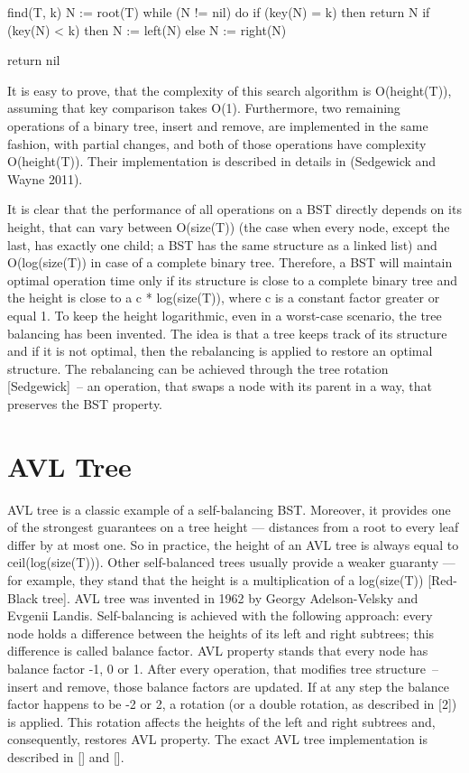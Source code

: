 find(T, k)
N := root(T)
while (N != nil) do
  if (key(N) = k) then
    return N
  if (key(N) < k) then
    N := left(N)
  else
    N := right(N)

return nil

It is easy to prove, that the complexity of this search algorithm is O(height(T)), assuming that key comparison takes O(1). Furthermore, two remaining operations of a binary tree, insert and remove, are implemented in the same fashion, with partial changes, and both of those operations have complexity O(height(T)). Their implementation is described in details in (Sedgewick and Wayne 2011).

It is clear that the performance of all operations on a BST directly depends on its height, that can vary between O(size(T)) (the case when every node, except the last, has exactly one child; a BST has the same structure as a linked list) and O(log(size(T)) in case of a complete binary tree. Therefore, a BST will maintain optimal operation time only if its structure is close to a complete binary tree and the height is close to a c * log(size(T)), where c is a constant factor greater or equal 1. To keep the height logarithmic, even in a worst-case scenario, the tree balancing has been invented. The idea is that a tree keeps track of its structure and if it is not optimal, then the rebalancing is applied to restore an optimal structure. The rebalancing can be achieved through the tree rotation [Sedgewick]~-- an operation, that swaps a node with its parent in a way, that preserves the BST property.


\section{AVL Tree}

AVL tree is a classic example of a self-balancing BST. Moreover, it provides one of the strongest guarantees on a tree height — distances from a root to every leaf differ by at most one. So in practice, the height of an AVL tree is always equal to ceil(log(size(T))). Other self-balanced trees usually provide a weaker guaranty — for example, they stand that the height is a multiplication of a log(size(T)) [Red-Black tree]. AVL tree was invented in 1962 by Georgy Adelson-Velsky and Evgenii Landis. Self-balancing is achieved with the following approach: every node holds a difference between the heights of its left and right subtrees; this difference is called balance factor. AVL property stands that every node has balance factor -1, 0 or 1. After every operation, that modifies tree structure~-- insert and remove, those balance factors are updated. If at any step the balance factor happens to be -2 or 2, a rotation (or a double rotation, as described in [2]) is applied. This rotation affects the heights of the left and right subtrees and, consequently, restores AVL property. The exact AVL tree implementation is described in [] and [].

